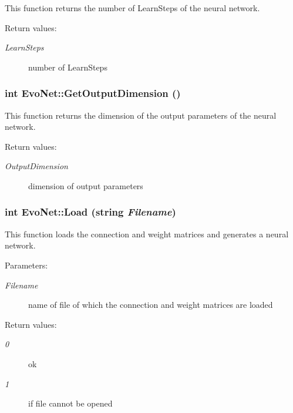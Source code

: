 This function returns the number of Learn\-Steps of the neural network.

\begin{Desc}
\item[Return values: ]\par
\begin{description}
\item[{\em 
Learn\-Steps}]number of Learn\-Steps \end{description}
\end{Desc}
\subsubsection{\setlength{\rightskip}{0pt plus 5cm}int Evo\-Net::Get\-Output\-Dimension ()}\label{classEvoNet_a17}


This function returns the dimension of the output parameters of the neural network.

\begin{Desc}
\item[Return values: ]\par
\begin{description}
\item[{\em 
Output\-Dimension}]dimension of output parameters \end{description}
\end{Desc}
\subsubsection{\setlength{\rightskip}{0pt plus 5cm}int Evo\-Net::Load (string {\em Filename})}\label{classEvoNet_a13}


This function loads the connection and weight matrices and generates a neural network.

\begin{Desc}
\item[Parameters: ]\par
\begin{description}
\item[{\em 
Filename}]name of file of which the connection and weight matrices are loaded \end{description}
\end{Desc}
\begin{Desc}
\item[Return values: ]\par
\begin{description}
\item[{\em 
0}]ok \item[{\em 
1}]if file cannot be opened \end{description}
\end{Desc}
